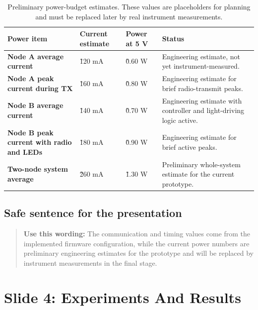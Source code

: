 \documentclass[11pt,a4paper]{article}
\begin{document}
\begin{table}[h!]
\centering
\small
\begin{tabularx}{\textwidth}{>{\bfseries}p{} >{\raggedright\arraybackslash}p{} >{\raggedright\arraybackslash}p{} Y}
\toprule
Power item & Current estimate & Power at 5 V & Status \\
\midrule
Node A average current & \~120 mA & \~0.60 W & Engineering estimate, not yet instrument-measured. \\
Node A peak current during TX & \~160 mA & \~0.80 W & Engineering estimate for brief radio-transmit peaks. \\
Node B average current & \~140 mA & \~0.70 W & Engineering estimate with controller and light-driving logic active. \\
Node B peak current with radio and LEDs & \~180 mA & \~0.90 W & Engineering estimate for brief active peaks. \\
Two-node system average & \~260 mA & \~1.30 W & Preliminary whole-system estimate for the current prototype. \\
\bottomrule
\end{tabularx}
\caption{Preliminary power-budget estimates. These values are placeholders for planning and must be replaced later by real instrument measurements.}
\end{table}

\subsection*{Safe sentence for the presentation}

\begin{quote}
\textbf{Use this wording:} The communication and timing values come from the implemented firmware configuration, while the current power numbers are preliminary engineering estimates for the prototype and will be replaced by instrument measurements in the final stage.
\end{quote}

\clearpage

\section{Slide 4: Experiments And Results}
\end{document}
